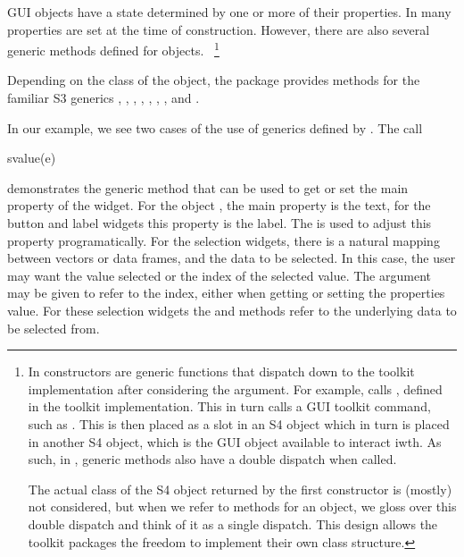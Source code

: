 GUI objects have a state determined by one or more of their
properties. In  many properties are set at the time of
construction. However, there are also several generic methods defined
for  objects. ~\footnote{
  In  constructors are generic functions that dispatch
  down to the toolkit implementation after considering the
   argument. For example,  calls
  , defined in the toolkit implementation. This in
  turn calls a GUI toolkit command, such as
  . This is then placed as a slot in an S4 object
  which in turn is placed in another S4 object, which is the GUI
  object available to interact iwth. As such, in , generic
  methods also have a double dispatch when called.
 
  The actual class of
  the S4 object returned by the first constructor is (mostly) not
  considered, but when we refer to methods for an object, we gloss
  over this double dispatch and think of it as a single dispatch. This
  design allows the toolkit packages the freedom to implement their
  own class structure.
}

Depending on the class of the object, the  package provides methods
for the familiar S3 generics \generic{[}, \generic{[$<$-},
, , , ,
,  and .


In our example, we see two cases of the use of generics defined by
. The call
\begin{Schunk}
\begin{Sinput}
 svalue(e)
\end{Sinput}
\end{Schunk}
%
demonstrates the generic method  that can be used to get or set the
main property of the widget. For the object , the main
property is the text, for the button and label widgets this property
is the label. The  is used to adjust this property
programatically. For the selection widgets, there is a natural mapping
between vectors or data frames, and the data to be selected. In this
case, the user may want the value selected or the index of the
selected value. The  argument may be given to refer
to the index, either when getting or setting the properties value. For
these selection widgets the \meth{[} and \meth{[\ASSIGN} methods refer
to the underlying data to be selected from.




